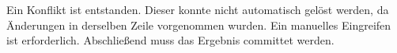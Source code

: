 Ein Konflikt ist entstanden. Dieser konnte nicht automatisch gelöst werden, da Änderungen in derselben Zeile vorgenommen wurden. Ein manuelles Eingreifen ist erforderlich. Abschließend muss das Ergebnis committet werden.
